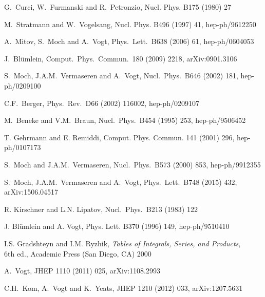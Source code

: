 \documentclass[12pt]{article}
\begin{document}
{\begin{thebibliography}{99}
G.~Curci, W.~Furmanski and R.~Petronzio,
  Nucl. Phys. B175 (1980) 27

M.~Stratmann and W.~Vogelsang,
  Nucl. Phys. B496 (1997) 41, hep-ph/9612250

A.~Mitov, S.~Moch and A.~Vogt,
  Phys.\ Lett.\ B638 (2006) 61, hep-ph/0604053

   J.~Bl\"umlein,
  Comput.\ Phys.\ Commun.\  180 (2009) 2218, arXiv:0901.3106

  S.~Moch, J.A.M.~Vermaseren and A.~Vogt,
  Nucl.\ Phys.\ B646 (2002) 181, hep-ph/0209100

  C.F.~Berger,
  Phys.\ Rev.\ D66 (2002) 116002, hep-ph/0209107

M.~Beneke and V.M.~Braun,
  Nucl.\ Phys.\ B454 (1995) 253, hep-ph/9506452

T. Gehrmann and E. Remiddi,
  Comput. Phys. Commun. 141 (2001) 296, hep-ph/0107173

S.~Moch and J.A.M.~Vermaseren,
  Nucl.\ Phys.\ B573 (2000) 853, hep-ph/9912355

S.~Moch, J.A.M.~Vermaseren and A.~Vogt,
  Phys.\ Lett.\ B748 (2015) 432, arXiv:1506.04517

R. Kirschner and L.N. Lipatov,
  Nucl.\ Phys.\ B213 (1983) 122

J. Bl\"umlein and A. Vogt,
  Phys. Lett. B370 (1996) 149, hep-ph/9510410

I.S. Gradshteyn and I.M. Ryzhik, 
  {\it Tables of Integrals, Series, and Products},\\[1mm]
  6th ed., Academic Press (San Diego, CA) 2000 

A.~Vogt, JHEP 1110 (2011) 025, arXiv:1108.2993

C.H.~Kom, A.~Vogt and K.~Yeats,
  JHEP 1210 (2012) 033, arXiv:1207.5631


\end{thebibliography}}
\end{document}
